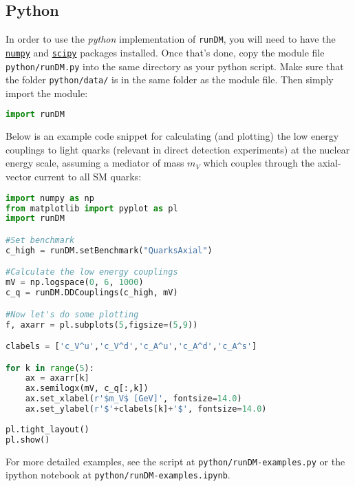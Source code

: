 \documentclass[notitlepage,12pt]{article}
\newcommand{\runDM}{\texttt{runDM}\xspace}
\begin{document}
\subsection{Python}

In order to use the \textit{python} implementation of \runDM, you will need to have the \href{http://www.numpy.org}{\texttt{numpy}} and \href{https://www.scipy.org/index.html}{\texttt{scipy}} packages installed.  Once that's done, copy the module file \texttt{python/runDM.py} into the same directory as your python script. Make sure that the folder \texttt{python/data/} is in the same folder as the module file. Then simply import the module:

\begin{lstlisting}[language=Python]
import runDM
\end{lstlisting}

Below is an example code snippet for calculating (and plotting) the low energy couplings to light quarks (relevant in direct detection experiments) at the nuclear energy scale, assuming a mediator of mass $m_V$ which couples through the axial-vector current to all SM quarks:

\begin{lstlisting}[language=Python]
import numpy as np
from matplotlib import pyplot as pl
import runDM

#Set benchmark
c_high = runDM.setBenchmark("QuarksAxial")

#Calculate the low energy couplings
mV = np.logspace(0, 6, 1000)
c_q = runDM.DDCouplings(c_high, mV)

#Now let's do some plotting
f, axarr = pl.subplots(5,figsize=(5,9))

clabels = ['c_V^u','c_V^d','c_A^u','c_A^d','c_A^s']

for k in range(5):
    ax = axarr[k]
    ax.semilogx(mV, c_q[:,k])
    ax.set_xlabel(r'$m_V$ [GeV]', fontsize=14.0)
    ax.set_ylabel(r'$'+clabels[k]+'$', fontsize=14.0)
    
pl.tight_layout()
pl.show()
\end{lstlisting}
For more detailed examples, see the script at \texttt{python/runDM-examples.py} or the ipython notebook at \texttt{python/runDM-examples.ipynb}.
\end{document}
